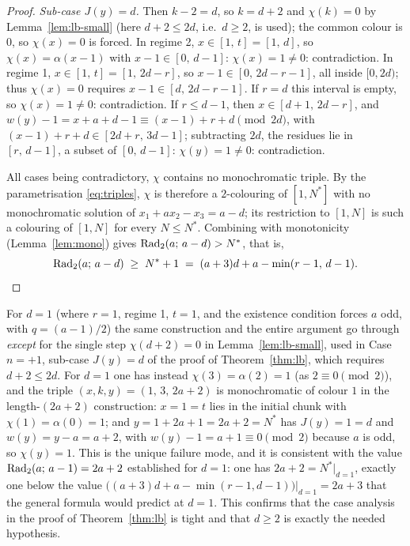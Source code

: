 \begin{proof}
\emph{Sub-case $J(y) = d$.} Then $k - 2 = d$, so $k = d + 2$ and $\chi(k) = 0$ by
Lemma~\ref{lem:lb-small} (here $d + 2 \le 2d$, i.e.\ $d \ge 2$, is used); the
common colour is $0$, so $\chi(x) = 0$ is forced. In regime 2,
$x \in [1,\, t] = [1,\, d]$, so $\chi(x) = \alpha(x - 1)$ with
$x - 1 \in [0,\, d - 1]$: $\chi(x) = 1 \ne 0$: contradiction. In regime 1,
$x \in [1,\, t] = [1,\, 2d - r]$, so $x - 1 \in [0,\, 2d - r - 1]$, all inside
$[0, 2d)$; thus $\chi(x) = 0$ requires $x - 1 \in [d,\, 2d - r - 1]$. If $r = d$
this interval is empty, so $\chi(x) = 1 \ne 0$: contradiction. If $r \le d - 1$,
then $x \in [d + 1,\, 2d - r]$, and
$w(y) - 1 = x + a + d - 1 \equiv (x - 1) + r + d \pmod{2d}$, with
$(x - 1) + r + d \in [2d + r,\, 3d - 1]$; subtracting $2d$, the residues lie in
$[r,\, d - 1]$, a subset of $[0,\, d - 1]$: $\chi(y) = 1 \ne 0$: contradiction.

All cases being contradictory, $\chi$ contains no monochromatic triple. By the
parametrisation \eqref{eq:triples}, $\chi$ is therefore a $2$-colouring of
$[1, N^{*}]$ with no monochromatic solution of $x_1 + a x_2 - x_3 = a - d$; its
restriction to $[1, N]$ is such a colouring of $[1, N]$ for every $N \le N^{*}$.
Combining with monotonicity (Lemma~\ref{lem:mono}) gives
$\mathrm{Rad}_2(a;\, a - d) > N^{*}$, that is,
\[
  \mathrm{Rad}_2(a;\, a - d) \;\ge\; N^{*} + 1 \;=\; (a+3)d + a - \min(r-1,\, d-1). \qedhere
\]
\end{proof}

\begin{remark}[sharpness of $d \ge 2$; consistency with the case $d = 1$]\label{rem:lb-d1}
For $d = 1$ (where $r = 1$, regime 1, $t = 1$, and the existence condition forces
$a$ odd, with $q = (a-1)/2$) the same construction and the entire argument go
through \emph{except} for the single step $\chi(d + 2) = 0$ in
Lemma~\ref{lem:lb-small}, used in Case $n = +1$, sub-case $J(y) = d$ of the proof
of Theorem~\ref{thm:lb}, which requires $d + 2 \le 2d$. For $d = 1$ one has
instead $\chi(3) = \alpha(2) = 1$ (as $2 \equiv 0 \pmod 2$), and the triple
$(x, k, y) = (1,\, 3,\, 2a + 2)$ is monochromatic of colour $1$ in the
length-$(2a+2)$ construction: $x = 1 = t$ lies in the initial chunk with
$\chi(1) = \alpha(0) = 1$; and $y = 1 + 2a + 1 = 2a + 2 = N^{*}$ has
$J(y) = 1 = d$ and $w(y) = y - a = a + 2$, with
$w(y) - 1 = a + 1 \equiv 0 \pmod 2$ because $a$ is odd, so $\chi(y) = 1$. This is
the unique failure mode, and it is consistent with the value
$\mathrm{Rad}_2(a;\, a - 1) = 2a + 2$ established for $d = 1$: one has
$2a + 2 = N^{*}\big|_{d=1}$, exactly one below the value
$\bigl((a+3)d + a - \min(r-1, d-1)\bigr)\big|_{d=1} = 2a + 3$ that the general
formula would predict at $d = 1$.
This confirms that the case analysis in the proof of Theorem~\ref{thm:lb} is
tight and that $d \ge 2$ is exactly the needed hypothesis.
\end{remark}


